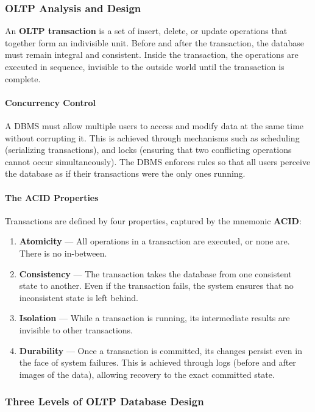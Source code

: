 \documentclass[12pt,a4paper]{article}
\begin{document}
\subsubsection{OLTP Analysis and Design}

An \textbf{OLTP transaction} is a set of insert, delete, or update operations that together form an indivisible unit.  
Before and after the transaction, the database must remain integral and consistent.  
Inside the transaction, the operations are executed in sequence, invisible to the outside world until the transaction is complete.

\paragraph{Concurrency Control}  
A DBMS must allow multiple users to access and modify data at the same time without corrupting it.  
This is achieved through mechanisms such as scheduling (serializing transactions),  
and locks (ensuring that two conflicting operations cannot occur simultaneously).  
The DBMS enforces rules so that all users perceive the database as if their transactions were the only ones running.

\paragraph{The ACID Properties}  
Transactions are defined by four properties, captured by the mnemonic \textbf{ACID}:
\begin{enumerate}
    \item \textbf{Atomicity} --- All operations in a transaction are executed, or none are. There is no in-between.
    \item \textbf{Consistency} --- The transaction takes the database from one consistent state to another.  
    Even if the transaction fails, the system ensures that no inconsistent state is left behind.
    \item \textbf{Isolation} --- While a transaction is running, its intermediate results are invisible to other transactions.
    \item \textbf{Durability} --- Once a transaction is committed, its changes persist even in the face of system failures.  
    This is achieved through logs (before and after images of the data),  
    allowing recovery to the exact committed state.
\end{enumerate}

\subsubsection{Three Levels of OLTP Database Design}
\end{document}
